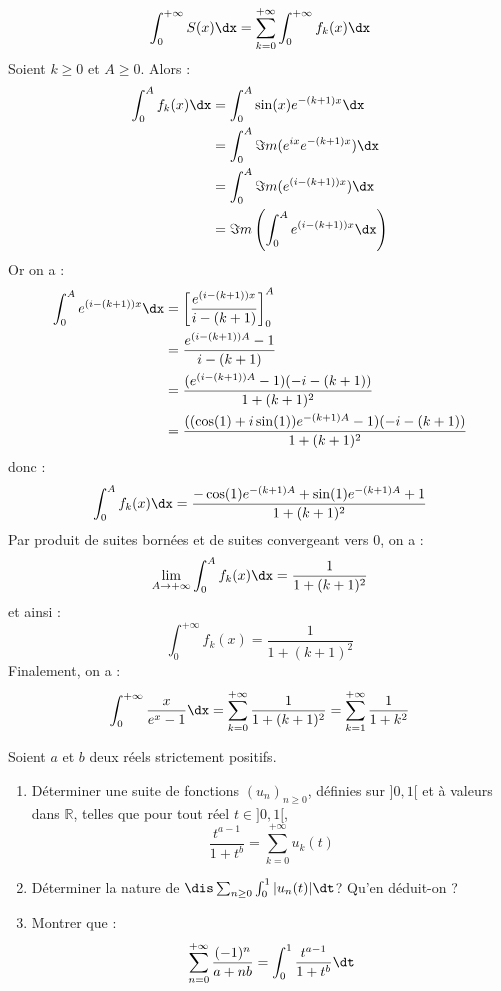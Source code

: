 \documentclass[a4paper,10pt]{report}
\begin{document}
$$ \int_0^{+ \infty} S(x) \dx = \sum_{k=0}^{+ \infty} \int_0^{+ \infty} f_k(x) \dx$$
Soient $k \geq 0$ et $A \geq 0$. Alors :
\begin{align*}
\int_0^A f_k(x) \dx &  = \int_0^A \sin(x) e^{-(k+1)x} \dx \\
& = \int_0^A \Im m(e^{ix}  e^{-(k+1)x}) \dx \\
& = \int_0^A \Im m(e^{(i-(k+1))x}) \dx \\
& = \Im m  \left(  \int_0^A e^{(i-(k+1))x} \dx \right) \\
\end{align*}
Or on a :
\begin{align*}
\int_0^A e^{(i-(k+1))x} \dx & = \left[ \dfrac{e^{(i-(k+1))x}}{i-(k+1)} \right]_0^A \\
& = \dfrac{e^{(i-(k+1))A} - 1}{i-(k+1)} \\
& = \dfrac{(e^{(i-(k+1))A} - 1)(-i-(k+1))}{1+(k+1)^2} \\
& = \dfrac{((\cos(1)+i \sin(1))e^{-(k+1)A} - 1)(-i-(k+1))}{1+(k+1)^2} 
\end{align*}
donc :
$$\int_0^A f_k(x) \dx = \dfrac{-\cos(1)e^{-(k+1)A}+ \sin(1)e^{-(k+1)A}+1}{1+(k+1)^2}$$
Par produit de suites bornées et de suites convergeant vers $0$, on a :
$$ \lim_{A \rightarrow + \infty} \int_0^A f_k(x) \dx = \dfrac{1}{1+(k+1)^2}$$
et ainsi :
$$ \int_0^{+ \infty} f_k(x)  = \dfrac{1}{1+(k+1)^2}$$
Finalement, on a :
$$ \int_0^{+ \infty} \dfrac{x}{e^x-1} \dx = \sum_{k=0}^{+ \infty} \dfrac{1}{1+(k+1)^2} =  \sum_{k=1}^{+ \infty} \dfrac{1}{1+k^2}$$

\begin{Exercice}{} Soient $a$ et $b$ deux réels strictement positifs.
\begin{enumerate}
\item Déterminer une suite de fonctions $(u_n)_{n \geq 0}$, définies sur $]0,1[$ et à valeurs dans $\mathbb{R}$, telles que pour tout réel $t \in ]0,1[$,
$$ \dfrac{t^{a-1}}{1+t^b} = \sum_{k=0}^{+ \infty} u_k(t)$$
\item Déterminer la nature de $\dis \sum_{n \geq 0} \int_0^1 \vert u_n(t) \vert \dt$? Qu'en déduit-on ?
\item Montrer que :
$$ \sum_{n=0}^{+ \infty} \dfrac{(-1)^n}{a+nb} = \int_0^1 \dfrac{t^{a-1}}{1+t^b} \dt$$
\end{enumerate}
\end{Exercice}

\corr 
\end{document}
